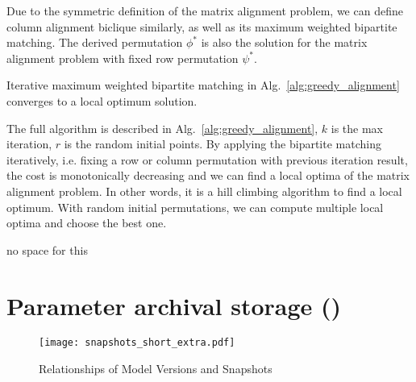 \documentclass[conference]{IEEEtran}
\begin{document}
{Due to the symmetric definition of the matrix alignment problem, we can define column alignment biclique similarly, as well as its maximum weighted bipartite matching. The derived permutation $\phi^*$ is also the solution for the matrix alignment problem with fixed row permutation $\psi^*$. 


\begin{lemma} Iterative maximum weighted bipartite matching in Alg.~\ref{alg:greedy_alignment} converges to a local optimum solution.  
\end{lemma}


The full algorithm is described in Alg.~\ref{alg:greedy_alignment}, $k$ is the max iteration, $r$ is the random initial points. By applying the bipartite matching iteratively, i.e. fixing a row or column permutation with previous iteration result, the cost is monotonically decreasing and we can find a local optima of the matrix alignment problem. In other words, it is a hill climbing algorithm to find a local optimum. With random initial permutations, we can compute multiple local optima and choose the best one. 
}{no space for this}

\section{Parameter archival storage (\weightstore)}
\label{sec:binary_storage}




\begin{figure}[!t]
\centering
\texttt{[image: snapshots\_short\_extra.pdf]}
\caption{Relationships of Model Versions and Snapshots}
\label{fig:snapshots}
\end{figure}



\end{document}
